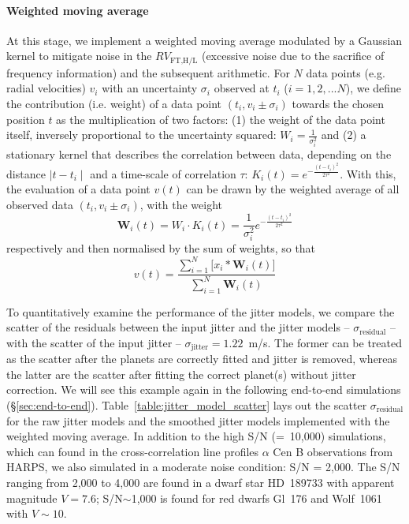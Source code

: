 \paragraph{Weighted moving average} At this stage, we implement a weighted moving average modulated by a Gaussian kernel to mitigate noise in the $RV_\text{FT,H/L}$ (excessive noise due to the sacrifice of frequency information) and the subsequent arithmetic. For $N$ data points (e.g. radial velocities) $v_i$ with an uncertainty $\sigma_i$ observed at $t_i$ ($i=1,2,...N$), we define the contribution (i.e. weight) of a data point $(t_i, v_i\pm \sigma_i)$ towards the chosen position $t$ as the multiplication of two factors: (1) the weight of the data point itself, inversely proportional to the uncertainty squared: $W_i= \frac{1}{\sigma_i^2}$ and (2) a stationary kernel that describes the correlation between data, depending on the distance $\mid t-t_i \mid$ and a time-scale of correlation $\tau$: $K_i(t) = e^{-\frac{(t-t_i)^2}{2\tau^2}}$. With this, the evaluation of a data point $v(t)$ can be drawn by the weighted average of all observed data $(t_i, v_i\pm \sigma_i)$, with the weight 
\begin{equation}
	\textbf{W}_i(t) = W_i \cdot K_i(t) = \frac{1}{\sigma_i^2} e^{-\frac{(t-t_i)^2}{2\tau^2}}
\end{equation}
respectively and then normalised by the sum of weights, so that 
\begin{equation}
	v(t) 	=  \frac{\sum\limits_{i=1}^{N} \bigg[x_i*\textbf{W}_i(t)\bigg]}{\sum\limits_{i=1}^{N} \textbf{W}_i(t)}
\end{equation}

To quantitatively examine the performance of the jitter models, we compare the scatter of the residuals between the input jitter and the jitter models -- $\sigma_\text{residual}$ -- with the scatter of the input jitter -- $\sigma_\text{jitter} = 1.22$~m/s. The former can be treated as the scatter after the planets are correctly fitted and jitter is removed, whereas the latter are the scatter after fitting the correct planet(s) without jitter correction. We will see this example again in the following end-to-end simulations (\S\ref{sec:end-to-end}). Table~\ref{table:jitter_model_scatter} lays out the scatter $\sigma_\text{residual}$ for the raw jitter models and the smoothed jitter models implemented with the weighted moving average. In addition to the high S/N (=~10,000) simulations, which can found in the cross-correlation line profiles $\alpha$ Cen B observations from HARPS, we also simulated in a moderate noise condition: S/N = 2,000. The S/N ranging from 2,000 to 4,000 are found in a dwarf star HD~189733 with apparent magnitude $V=7.6$; S/N$\sim$1,000 is found for red dwarfs Gl~176 and Wolf~1061 with $V\sim10$. 

